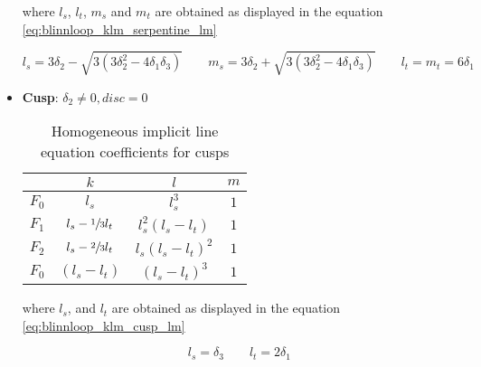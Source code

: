 \documentclass[\topdir/main.tex]{subfiles}
\begin{document}
\begin{itemize}
        where $l_s$, $l_t$, $m_s$ and $m_t$ are obtained as displayed in the equation \eqref{eq:blinnloop_klm_serpentine_lm}
        
        \begin{equation} \label{eq:blinnloop_klm_serpentine_lm}
            l_s = 3\delta_2 - \sqrt{3(3\delta_2^2 - 4\delta_1\delta_3)} \qquad
            m_s = 3\delta_2 + \sqrt{3(3\delta_2^2 - 4\delta_1\delta_3)} \qquad
            l_t = m_t = 6 \delta_1
        \end{equation}

     
    \item \textbf{Cusp}: $\delta_2 \neq 0, disc = 0$
        \begin{table}[H]
            \centering
            \begin{tabular}{|l|c|c|c|}
                \hline
                \qquad&     $k$ &               $l$ &               $m$             \\\hline
                $F_0$ &     $l_s$ &             $l_s^3$ &           $1$             \\\hline
                $F_1$ &     $l_s - \sfrac{1}{3} l_t$ &    
                            $l_s^2 (l_s - l_t)$ &               
                            $1$ \\\hline
                $F_2$ &     $l_s - \sfrac{2}{3} l_t$ &    
                            $l_s (l_s - l_t)^2$ &               
                            $1$ \\\hline
                $F_0$ &     $(l_s - l_t)$ &     $(l_s - l_t)^3$ &   $1$             \\\hline
            \end{tabular}
            \caption{Homogeneous implicit line equation coefficients for cusps}
            \label{tab:blinnloop_klm_cusp}
        \end{table}
        
        where $l_s$, and $l_t$  are obtained as displayed in the equation \eqref{eq:blinnloop_klm_cusp_lm}
    
        \begin{equation} \label{eq:blinnloop_klm_cusp_lm}
            l_s = \delta_3\qquad
            l_t = 2 \delta_1
        \end{equation}
    

\end{itemize}
\end{document}
